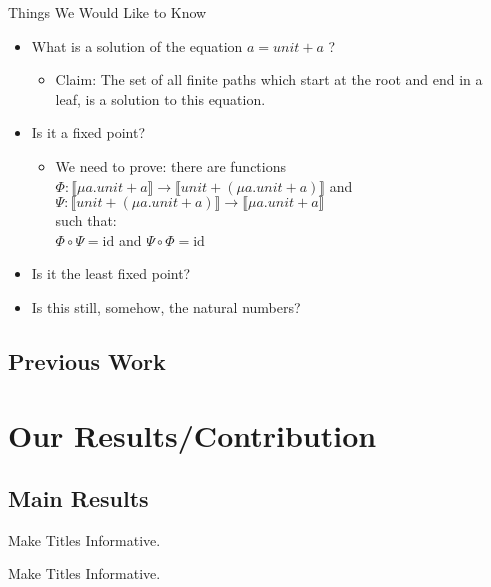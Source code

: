 \documentclass{beamer}
\newcommand{\arr}{\rightarrow}
\begin{document}
\begin{frame}{Things We Would Like to Know}

  \begin{itemize}
    \item What is a solution of the equation $a = unit + a$ ?
    \begin{itemize}
      \item Claim: The set of all finite paths which start at the root and end
            in a leaf, is a solution to this equation.
    \end{itemize}
    \item Is it a fixed point?
    \begin{itemize}
      \item We need to prove: there are functions
            $\Phi : \llbracket \mu a . unit + a \rrbracket \arr \llbracket unit + (\mu a . unit + a) \rrbracket$
            and
            $\Psi : \llbracket unit + (\mu a . unit + a) \rrbracket \arr \llbracket \mu a . unit + a \rrbracket$ \\
            such that: \\
            $\Phi \circ \Psi = \text{id}$ and $\Psi \circ \Phi = \text{id}$
    \end{itemize}
    \item Is it the least fixed point?
    \item Is this still, somehow, the natural numbers?
  \end{itemize}

\end{frame}

\subsection{Previous Work}




\section{Our Results/Contribution}

\subsection{Main Results}

\begin{frame}{Make Titles Informative.}
\end{frame}

\begin{frame}{Make Titles Informative.}
\end{frame}
\end{document}
